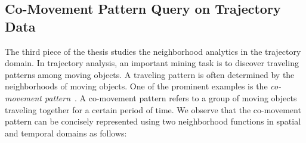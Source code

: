 \subsection{Co-Movement Pattern Query on Trajectory Data}
The third piece of the thesis studies the neighborhood
analytics in the trajectory domain. 
In trajectory analysis, an important
mining task is to discover traveling patterns among moving objects. 
A traveling pattern is often determined by the neighborhoods of moving objects. One of the prominent examples is the \emph{co-movement pattern}~\cite{li2013effective,zheng2015trajectory}.
A co-movement pattern refers to a group of moving objects traveling together for a certain period of time. 
We observe that the co-movement pattern can be concisely represented using two neighborhood functions in spatial and temporal domains as follows:

